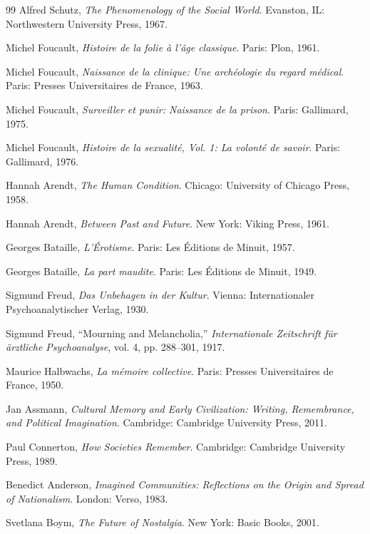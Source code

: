 \documentclass[11pt,oneside]{book}
\theoremstyle{definition}
\theoremstyle{remark}
\begin{document}
\begin{thebibliography}{99}
 Alfred Schutz, \emph{The Phenomenology of the Social World}. Evanston, IL: Northwestern
  University Press, 1967.

 Michel Foucault, \emph{Histoire de la folie \`a l'\^age classique}. Paris: Plon, 1961.

 Michel Foucault, \emph{Naissance de la clinique: Une arch\'eologie du regard m\'edical}. Paris:
  Presses Universitaires de France, 1963.

 Michel Foucault, \emph{Surveiller et punir: Naissance de la prison}. Paris: Gallimard, 1975.

 Michel Foucault, \emph{Histoire de la sexualit\'e, Vol. 1: La volont\'e de savoir}. Paris:
  Gallimard, 1976.

 Hannah Arendt, \emph{The Human Condition}. Chicago: University of Chicago Press, 1958.

 Hannah Arendt, \emph{Between Past and Future}. New York: Viking Press, 1961.

 Georges Bataille, \emph{L'\'Erotisme}. Paris: Les \'Editions de Minuit, 1957.

 Georges Bataille, \emph{La part maudite}. Paris: Les \'Editions de Minuit, 1949.

 Sigmund Freud, \emph{Das Unbehagen in der Kultur}. Vienna: Internationaler Psychoanalytischer
  Verlag, 1930.

 Sigmund Freud, ``Mourning and Melancholia,'' \emph{Internationale Zeitschrift f\"ur \"arztliche
  Psychoanalyse}, vol. 4, pp. 288--301, 1917.

 Maurice Halbwachs, \emph{La m\'emoire collective}. Paris: Presses Universitaires de France,
  1950.

 Jan Assmann, \emph{Cultural Memory and Early Civilization: Writing, Remembrance, and Political
  Imagination}. Cambridge: Cambridge University Press, 2011.

 Paul Connerton, \emph{How Societies Remember}. Cambridge: Cambridge University Press, 1989.

 Benedict Anderson, \emph{Imagined Communities: Reflections on the Origin and Spread of
  Nationalism}. London: Verso, 1983.

 Svetlana Boym, \emph{The Future of Nostalgia}. New York: Basic Books, 2001.


\end{thebibliography}
\end{document}

